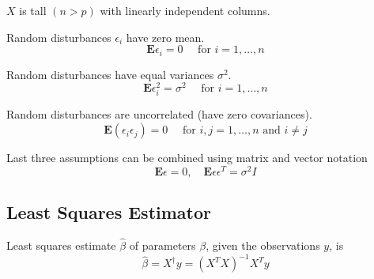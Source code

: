 \begin{proposition}
    $ X $ is tall $ (n>p) $ with linearly independent columns.
\end{proposition}

\begin{proposition}
    Random disturbances $ \epsilon_{i} $ have zero mean.
$$
\mathbf{E} \epsilon_{i}=0 \quad \text { for } i=1, \ldots, n
$$
\end{proposition}

\begin{proposition}
    Random disturbances have equal variances $ \sigma^{2} $.
$$
\mathbf{E} \epsilon_{i}^{2}=\sigma^{2} \quad \text { for } i=1, \ldots, n
$$
\end{proposition}

\begin{proposition}
    Random disturbances are uncorrelated (have zero covariances).
$$
\mathbf{E}\left(\epsilon_{i} \epsilon_{j}\right)=0 \quad \text { for } i, j=1, \ldots, n \text { and } i \neq j
$$
\end{proposition}

\begin{theorem}
    Last three assumptions can be combined using matrix and vector notation
$$
\mathbf{E} \epsilon=0, \quad \mathbf{E} \epsilon \epsilon^{T}=\sigma^{2} I
$$
\end{theorem}


\subsection{Least Squares Estimator}

\begin{theorem}
    Least squares estimate $ \hat{\beta} $ of parameters $ \beta $, given the observations $ y $, is
$$
\hat{\beta}=X^{\dagger} y=\left(X^{T} X\right)^{-1} X^{T} y
$$
\end{theorem}

